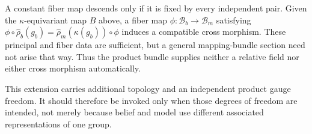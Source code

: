 A constant fiber map descends only if it is fixed by every independent pair.  Given the
$\kappa$-equivariant map $B$ above, a fiber map
$\phi:\mathcal B_b\to\mathcal B_m$ satisfying
$\phi\circ\widehat\rho_b(g_b)
=\widehat\rho_m(\kappa(g_b))\circ\phi$ induces a compatible cross morphism.
These principal and fiber data are sufficient, but a general mapping-bundle section need not arise
that way.  Thus the product bundle supplies neither a relative field nor either cross morphism
automatically.

This extension carries additional topology and an independent product gauge freedom.  It should
therefore be invoked only when those degrees of freedom are intended, not merely because belief
and model use different associated representations of one group.
